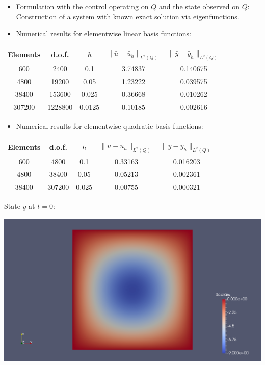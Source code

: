 \documentclass[10pt, USenglish]{beamer}
\begin{document}
\begin{frame}
\begin{itemize}
\item Formulation with the control operating on $Q$ and the state observed on $Q$: Construction of a system with known exact solution via eigenfunctions.
\item Numerical results for elementwise linear basis functions:
\end{itemize}
\begin{center}
\begin{tabular}{c|c|c|c|c}
Elements & d.o.f. & $h$ & $\| \bar{u} - \bar{u}_h \|_{L^2(Q)}$ & $\| \bar{y} - \bar{y}_h \|_{L^2(Q)}$ \\
\hline
600 & 2400 & 0.1 & 3.74837 & 0.140675 \\
4800 & 19200 & 0.05 & 1.23222 & 0.039575 \\
38400 & 153600 & 0.025 & 0.36668 & 0.010262 \\
307200 & 1228800 & 0.0125 & 0.10185 & 0.002616
\end{tabular}
\end{center}
\begin{itemize}
\item Numerical results for elementwise quadratic basis functions:
\end{itemize}
\begin{center}
\begin{tabular}{c|c|c|c|c}
Elements & d.o.f. & $h$ & $\| \bar{u} - \bar{u}_h \|_{L^2(Q)}$ & $\| \bar{y} - \bar{y}_h \|_{L^2(Q)}$ \\
\hline
600 & 4800 & 0.1 & 0.33163 & 0.016203 \\
4800 & 38400 & 0.05 & 0.05213 & 0.002361 \\
38400 & 307200 & 0.025 & 0.00755 & 0.000321
\end{tabular}
\end{center}
\end{frame}

\begin{frame}
State $y$ at $t = 0$:
\begin{center}
\includegraphics[width=\textwidth]{../thesis/Images/symm-3r-y-0t.png}
\end{center}
\end{frame}
\end{document}
